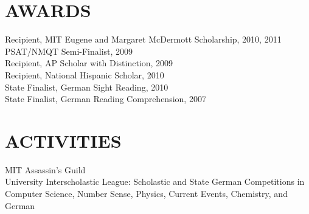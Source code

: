 \documentclass[margin]{res}
\begin{document}
\begin{resume}
\section{AWARDS} Recipient, MIT Eugene and Margaret McDermott Scholarship, 2010, 2011\\ 
        PSAT/NMQT Semi-Finalist, 2009 \\
        Recipient, AP Scholar with Distinction, 2009 \\ 
        Recipient, National Hispanic Scholar, 2010 \\
        State Finalist, German Sight Reading, 2010 \\
        State Finalist, German Reading Comprehension, 2007 

\section{ACTIVITIES}             
        MIT Assassin's Guild\\
        University Interscholastic League: Scholastic and State German Competitions in
        Computer Science, Number Sense, Physics, Current Events, Chemistry, and German
 

\end{resume}
\end{document}
